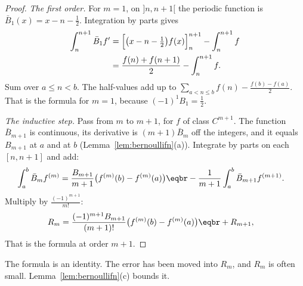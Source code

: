 \begin{proof}
\emph{The first order.} For $m=1$, on $]n,n+1[$ the periodic function is $\bar B_1(x)=x-n-\frac12$. Integration by parts gives
\[
\begin{aligned}\int_n^{n+1}\bar B_1f'&=\Bigl[\bigl(x-n-\tfrac12\bigr)f(x)\Bigr]_n^{n+1}-\int_n^{n+1}f\\&=\frac{f(n)+f(n+1)}2-\int_n^{n+1}f.\end{aligned}
\]
Sum over $a\le n<b$. The half-values add up to $\sum_{a<n\le b}f(n)-\frac{f(b)-f(a)}2$. That is the formula for $m=1$, because $(-1)^1B_1=\frac12$.

\emph{The inductive step.} Pass from $m$ to $m+1$, for $f$ of class $C^{m+1}$. The function $\bar B_{m+1}$ is continuous, its derivative is $(m+1)\bar B_m$ off the integers, and it equals $B_{m+1}$ at $a$ and at $b$ (Lemma~\ref{lem:bernoullifn}(a)). Integrate by parts on each $[n,n+1]$ and add:
\[
\begin{aligned}\int_a^b\bar B_mf^{(m)}&=\frac{B_{m+1}}{m+1}\bigl(f^{(m)}(b)-f^{(m)}(a)\bigr)\eqbr-\frac1{m+1}\int_a^b\bar B_{m+1}f^{(m+1)}.\end{aligned}
\]
Multiply by $\frac{(-1)^{m+1}}{m!}$:
\[
\begin{aligned}R_m&=\frac{(-1)^{m+1}B_{m+1}}{(m+1)!}\bigl(f^{(m)}(b)-f^{(m)}(a)\bigr)\eqbr+R_{m+1},\end{aligned}
\]
That is the formula at order $m+1$.
\end{proof}

The formula is an identity. The error has been moved into $R_m$, and $R_m$ is often small. Lemma~\ref{lem:bernoullifn}(c) bounds it.

